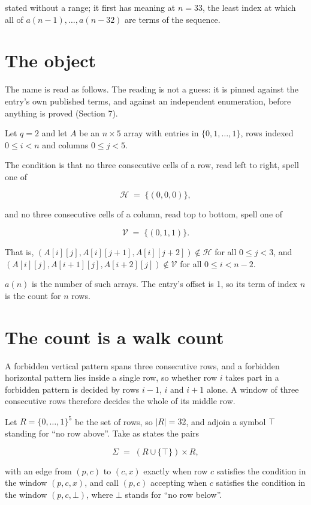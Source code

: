 \documentclass[11pt]{article}
\theoremstyle{definition}
\begin{document}
stated without a range; it first has meaning at $n = 33$, the least index at which all of $a(n-1),\dots,a(n-32)$ are terms of the sequence.

\section{The object}

The name is read as follows. The reading is not a guess: it is pinned against the entry's own published terms, and against an independent enumeration, before anything is proved (Section 7).

Let $q = 2$ and let $A$ be an $n \times 5$ array with entries in $\{0,1,\dots,1\}$, rows indexed $0 \le i < n$ and columns $0 \le j < 5$.

The condition is that no three consecutive cells of a row, read left to right, spell one of

\[\mathcal{H} \;=\; \{(0,0,0)\},\]

and no three consecutive cells of a column, read top to bottom, spell one of

\[\mathcal{V} \;=\; \{(0,1,1)\}.\]

That is, $(A[i][j],A[i][j{+}1],A[i][j{+}2]) \notin \mathcal{H}$ for all $0 \le j < 3$, and $(A[i][j],A[i{+}1][j],A[i{+}2][j]) \notin \mathcal{V}$ for all $0 \le i < n-2$.

$a(n)$ is the number of such arrays. The entry's offset is 1, so its term of index $n$ is the count for $n$ rows.

\section{The count is a walk count}

A forbidden vertical pattern spans three consecutive rows, and a forbidden horizontal pattern lies inside a single row, so whether row $i$ takes part in a forbidden pattern is decided by rows $i-1$, $i$ and $i+1$ alone. A window of three consecutive rows therefore decides the whole of its middle row.

Let $R = \{0,\dots,1\}^{5}$ be the set of rows, so $|R| = 32$, and adjoin a symbol $\top$ standing for ``no row above''. Take as states the pairs

\[\Sigma \;=\; (R \cup \{\top\}) \times R,\]

with an edge from $(p,c)$ to $(c,x)$ exactly when row $c$ satisfies the condition in the window $(p,c,x)$, and call $(p,c)$ accepting when $c$ satisfies the condition in the window $(p,c,\bot)$, where $\bot$ stands for ``no row below''.
\end{document}
